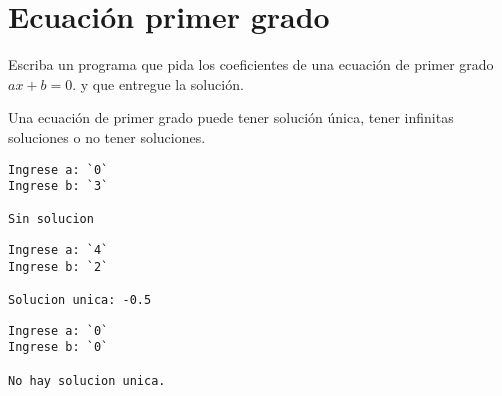 \section{Ecuación primer grado}

Escriba un programa que pida los coeficientes de una ecuación de primer
grado \(ax + b = 0\). y que entregue la solución.

Una ecuación de primer grado puede
tener solución única, tener infinitas soluciones o no tener soluciones.

\begin{lstlisting}[language=testcase]
Ingrese a: `0`
Ingrese b: `3`

Sin solucion
\end{lstlisting}

\begin{lstlisting}[language=testcase]
Ingrese a: `4`
Ingrese b: `2`

Solucion unica: -0.5
\end{lstlisting}

\begin{lstlisting}[language=testcase]
Ingrese a: `0`
Ingrese b: `0`

No hay solucion unica.
\end{lstlisting}
